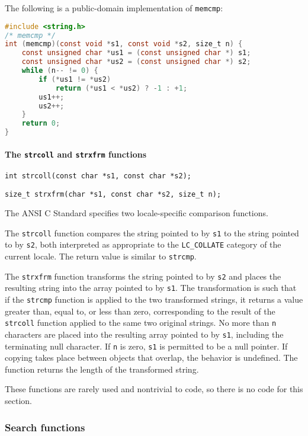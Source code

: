 The following is a public-domain implementation of \texttt{memcmp}:
\lstset{basicstyle=\scriptsize, numbers=left, captionpos=b, tabsize=4}
\begin{lstlisting}[caption=Section \thesection listing \arabic{stringcnt},language={C},
breaklines=true,xleftmargin=15pt,label=lst:section\thesection listing\arabic{stringcnt}]
#include <string.h>
/* memcmp */
int (memcmp)(const void *s1, const void *s2, size_t n) {
	const unsigned char *us1 = (const unsigned char *) s1;
	const unsigned char *us2 = (const unsigned char *) s2;
	while (n-- != 0) {
		if (*us1 != *us2)
			return (*us1 < *us2) ? -1 : +1;
		us1++;
		us2++;
	}
	return 0;
}
\end{lstlisting}

\paragraph{The \texttt{strcoll} and \texttt{strxfrm} functions}
\texttt{int strcoll(const char *s1, const char *s2);}

\texttt{size\_t strxfrm(char *s1, const char *s2, size\_t n);}

The ANSI C Standard specifies two locale-specific comparison functions.

The \texttt{strcoll} function compares the string pointed to by \texttt{s1} to
the string pointed to by \texttt{s2}, both interpreted as appropriate to the
\texttt{LC\_COLLATE} category of the current locale. The return value is
similar to \texttt{strcmp}.

The \texttt{strxfrm} function transforms the string pointed to by \texttt{s2}
and places the resulting string into the array pointed to by \texttt{s1}. The
transformation is such that if the \texttt{strcmp} function is applied to the
two transformed strings, it returns a value greater than, equal to, or less
than zero, corresponding to the result of the \texttt{strcoll} function applied
to the same two original strings. No more than \texttt{n} characters are placed
into the resulting array pointed to by \texttt{s1}, including the terminating
null character. If \texttt{n} is zero, \texttt{s1} is permitted to be a null
pointer. If copying takes place between objects that overlap, the behavior is
undefined. The function returns the length of the transformed string.

These functions are rarely used and nontrivial to code, so there is no code for
this section.

\subsubsection{Search functions}

